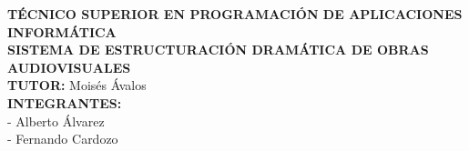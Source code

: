 \documentclass[12pt]{article}
\begin{document}
	
	\begin{center}
		\vspace*{5cm} %
		
		\textbf{\large TÉCNICO SUPERIOR EN PROGRAMACIÓN DE APLICACIONES INFORMÁTICA}\\[1em]
		
		\textbf{\large SISTEMA DE ESTRUCTURACIÓN DRAMÁTICA DE OBRAS AUDIOVISUALES}\\[2em]
		
		\textbf{TUTOR:} Moisés Ávalos\\[2em]
		
		\textbf{INTEGRANTES:}\\
		- Alberto Álvarez\\
		- Fernando Cardozo
		
		\vspace*{5cm} %
	\end{center}
	
\end{document}
